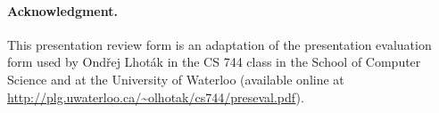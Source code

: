 \documentclass{article}
\begin{document}
\vfill

\paragraph{Acknowledgment.} This presentation review form is an adaptation of the presentation evaluation form used by Ond\v{r}ej Lhot\'{a}k in the CS 744 class in the School of Computer Science and at the University of Waterloo (available online at \url{http://plg.uwaterloo.ca/~olhotak/cs744/preseval.pdf}).
\end{document}
